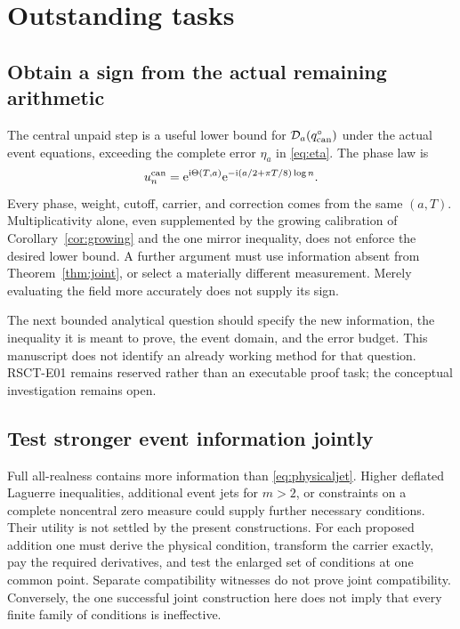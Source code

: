 \section{Outstanding tasks}\label{sec:outstanding}

\subsection{Obtain a sign from the actual remaining arithmetic}

The central unpaid step is a useful lower bound for
\(\mathcal D_a(q_{\mathrm{can}}^\circ)\) under the actual event equations,
exceeding the complete error \(\eta_a\) in \eqref{eq:eta}.
The phase law is
\[
 u_n^{\mathrm{can}}=\mathrm e^{\mathrm i\Theta(T,a)}
            \mathrm e^{-\mathrm i(a/2+\pi T/8)\log n}.
\]
Every phase, weight, cutoff, carrier, and correction comes from the same
\((a,T)\). Multiplicativity alone, even supplemented by the growing
calibration of Corollary~\ref{cor:growing} and the one mirror inequality,
does not enforce the desired lower bound.
A further argument must use information absent from
Theorem~\ref{thm:joint}, or select a materially different measurement.
Merely evaluating the field more accurately does not supply its sign.

The next bounded analytical question should specify the new information,
the inequality it is meant to prove, the event domain, and the error
budget. This manuscript does not identify an already working method for
that question. RSCT-E01 remains reserved rather than an executable proof
task; the conceptual investigation remains open.

\subsection{Test stronger event information jointly}

Full all-realness contains more information than
\eqref{eq:physicaljet}. Higher deflated Laguerre inequalities, additional
event jets for \(m>2\), or constraints on a complete noncentral zero
measure could supply further necessary conditions.
Their utility is not settled by the present constructions.
For each proposed addition one must derive the physical condition,
transform the carrier exactly, pay the required derivatives, and test
the enlarged set of conditions at one common point.
Separate compatibility witnesses do not prove joint compatibility.
Conversely, the one successful joint construction here does not imply
that every finite family of conditions is ineffective.

